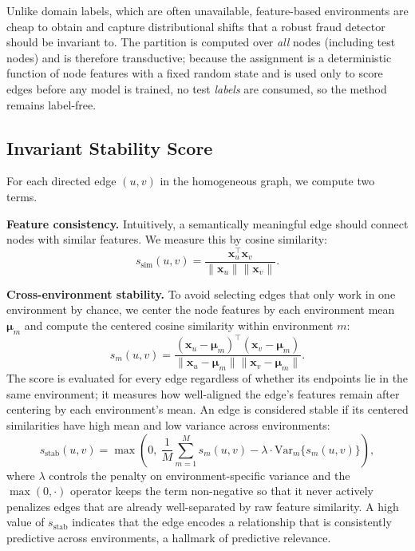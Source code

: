 \documentclass[11pt]{article}
\begin{document}
Unlike domain labels, which are often unavailable, feature-based environments are cheap to obtain and capture distributional shifts that a robust fraud detector should be invariant to. The partition is computed over \emph{all} nodes (including test nodes) and is therefore transductive; because the assignment is a deterministic function of node features with a fixed random state and is used only to score edges before any model is trained, no test \emph{labels} are consumed, so the method remains label-free.

\subsection{Invariant Stability Score}\label{sec:stability}

For each directed edge $(u,v)$ in the homogeneous graph, we compute two terms.

\textbf{Feature consistency.} Intuitively, a semantically meaningful edge should connect nodes with similar features. We measure this by cosine similarity:
\begin{equation}
    s_{\text{sim}}(u,v) = \frac{\mathbf{x}_u^\top \mathbf{x}_v}{\|\mathbf{x}_u\| \|\mathbf{x}_v\|}.
\end{equation}

\textbf{Cross-environment stability.} To avoid selecting edges that only work in one environment by chance, we center the node features by each environment mean $\boldsymbol{\mu}_m$ and compute the centered cosine similarity within environment $m$:
\begin{equation}
    s_m(u,v) = \frac{(\mathbf{x}_u-\boldsymbol{\mu}_m)^\top (\mathbf{x}_v-\boldsymbol{\mu}_m)}{\|\mathbf{x}_u-\boldsymbol{\mu}_m\| \|\mathbf{x}_v-\boldsymbol{\mu}_m\|}.
\end{equation}
The score is evaluated for every edge regardless of whether its endpoints lie in the same environment; it measures how well-aligned the edge's features remain after centering by each environment's mean. An edge is considered stable if its centered similarities have high mean and low variance across environments:
\begin{equation}
    s_{\text{stab}}(u,v) = \max\!\left(0,\ \frac{1}{M}\sum_{m=1}^M s_m(u,v) - \lambda \cdot \text{Var}_m\{s_m(u,v)\}\right),
\end{equation}
where $\lambda$ controls the penalty on environment-specific variance and the $\max(0,\cdot)$ operator keeps the term non-negative so that it never actively penalizes edges that are already well-separated by raw feature similarity. A high value of $s_{\text{stab}}$ indicates that the edge encodes a relationship that is consistently predictive across environments, a hallmark of predictive relevance.
\end{document}
